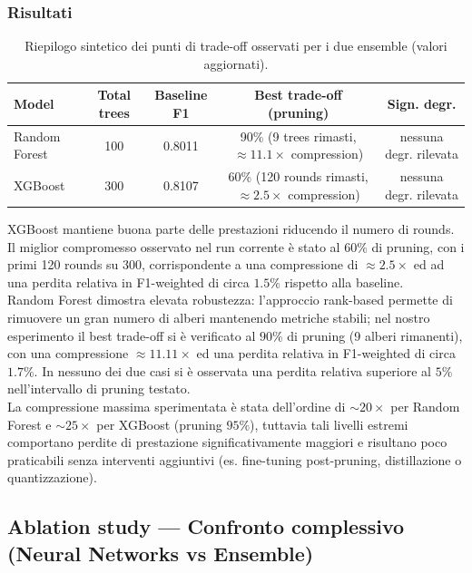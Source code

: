 \documentclass[a4paper,12pt]{report}
\begin{document}
	\subsubsection{Risultati}
	\begin{table}[H]
		\centering
		\setlength{\tabcolsep}{4pt}
		\begin{tabular}{lcccc}
			\toprule
			\textbf{Model} & \textbf{Total trees} & \textbf{Baseline F1} & \textbf{Best trade-off (pruning)} & \textbf{Sign. degr.} \\
			\midrule
			Random Forest & 100 & 0.8011 & 90\% (9 trees rimasti, $\approx 11.1\times$ compression) & nessuna degr. rilevata \\
			XGBoost       & 300 & 0.8107 & 60\% (120 rounds rimasti, $\approx 2.5\times$ compression) & nessuna degr. rilevata \\
			\bottomrule
		\end{tabular}
		\caption{Riepilogo sintetico dei punti di trade-off osservati per i due ensemble (valori aggiornati).}
	\end{table}
	
	XGBoost mantiene buona parte delle prestazioni riducendo il numero di rounds. Il miglior compromesso osservato nel run corrente è stato al $60\%$ di pruning, con i primi 120 rounds su 300, corrispondente a una compressione di $\approx 2.5\times$ ed ad una perdita relativa in F1-weighted di circa $1.5\%$ rispetto alla baseline. \\
	Random Forest dimostra elevata robustezza: l'approccio rank-based permette di rimuovere un gran numero di alberi mantenendo metriche stabili; nel nostro esperimento il best trade-off si è verificato al $90\%$ di pruning (9 alberi rimanenti), con una compressione $\approx 11.11\times$ ed una perdita relativa in F1-weighted di circa $1.7\%$. In nessuno dei due casi si è osservata una perdita relativa superiore al $5\%$ nell'intervallo di pruning testato. \\
	La compressione massima sperimentata è stata dell'ordine di $\sim 20\times$ per Random Forest e $\sim 25\times$ per XGBoost (pruning $95\%$), tuttavia tali livelli estremi comportano perdite di prestazione significativamente maggiori e risultano poco praticabili senza interventi aggiuntivi (es. fine-tuning post-pruning, distillazione o quantizzazione).
	
	\subsection{Ablation study — Confronto complessivo (Neural Networks vs Ensemble)}
	
\end{document}
